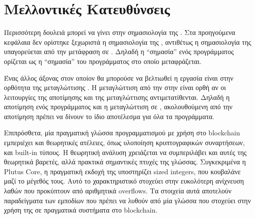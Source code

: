     \section{Μελλοντικές Κατευθύνσεις}

   Περισσότερη δουλειά μπορεί να γίνει στην σημασιολογία της \FIR{}. Στα
   προηγούμενα κεφάλαια δεν ορίστηκε ξεχωριστά η σημασιολογία της \FIR{},
   αντιθέτως η σημασιολογία της υπαγορεύεται από την μετάφραση σε \FOMF{}.
   Δηλαδή η ``σημασία'' ενός προγράμματος \FIR{} ορίζεται ως η ``σημασία'' του
   προγράμματος \FOMF{} στο οποίο μεταφράζεται.

   Ένας άλλος άξονας στον οποίον θα μπορούσε να βελτιωθεί η εργασία είναι στην
   ορθότητα της μεταγλώττισης . Η μεταγλώττιση από την \FIR{} στην \FOMF{}
   είναι ορθή αν οι λειτουργίες της αποτίμησης και της μεταγλώττισης
   αντιμετατίθενται.  Δηλαδή η αποτίμηση ενός προγράμματος \FIR{} και η
   μεταγλώττιση σε \FOMF{}, ακολουθούμενη από την αποτίμηση πρέπει να δίνουν το
   ίδιο αποτέλεσμα για όλα τα προγράμματα.

   Επιπρόσθετα, μία πραγματική γλώσσα προγραμματισμού με χρήση στο blockchain
   εμπεριέχει και θεωρητικές ατέλειες, όπως υλοποίηση κρυπτογραφικών
   συναρτήσεων, και built-in τύπους. Η θεωρητική ανάλυση χρειάζεται να
   συμπεριλάβει και αυτές της θεωρητικά βαρετές, αλλά πρακτικά σημαντικές
   πτυχές της γλώσσας. Συγκεκριμένα η Plutus Core, η πραγματική εκδοχή της
   \FOMF{} υποστηρίζει sized integers, που κουβαλάνε μαζί το μέγεθός τους. Αυτό
   το χαρακτηριστικό στοχεύει στην ευκολότερη ανίχνευση λαθών που προκύπτουν
   από αριθμητικά overflows. Τα στοιχεία αυτά αποτελούν παραδείγματα των
   εμποδίων που πρέπει να λυθούν από μία γλώσσα που στοχεύει στην χρήση της σε
   πραγματικά συστήματα στο blockchain.
